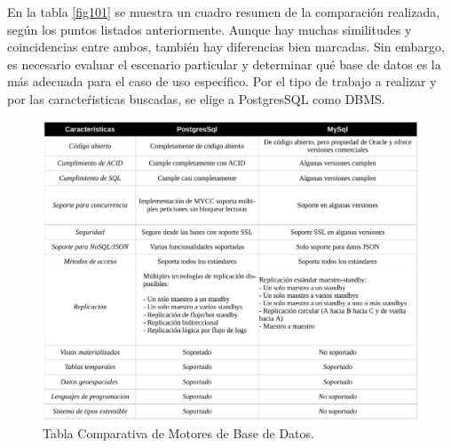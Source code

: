 \documentclass[11pt,oneside]{book}
\begin{document}
En la tabla \eqref{fig101} se muestra un cuadro resumen de la comparación realizada, según los puntos listados anteriormente. Aunque hay muchas similitudes y coincidencias entre ambos, también hay diferencias bien marcadas. Sin embargo, es necesario evaluar el escenario particular y determinar qué base de datos es la más adecuada para el caso de uso específico. Por el tipo de trabajo a realizar y por las caracteŕisticas buscadas, se elige a PostgresSQL como DBMS.

\renewcommand{\figurename}{Tabla.} 
\begin{figure}[tbhp]
\centerline{\includegraphics[scale=0.8]{figs/capitulo_1_analisis/Tabla_Comparativa_DB.pdf}}
\caption{Tabla Comparativa de Motores de Base de Datos.}
\label{fig101}
\end{figure}
\renewcommand{\figurename}{Figura.}

\newpage
\end{document}
